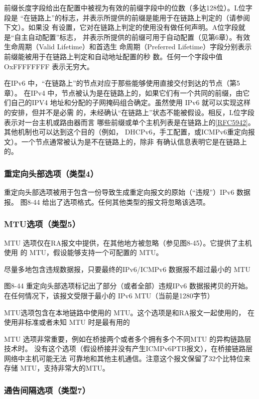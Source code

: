 前缀长度字段给出在配置中被视为有效的前缀字段中的位数（多达128位）。L位字段是
“在链路上”的标志，并表示所提供的前缀是能用于在链路上判定的（请参阅下文）。如果没
有设置，它对在链路上判定的使用没有做任何声明。A位字段就是“自主自动配置”标志，
并表示所提供的前缀可用于自动配置（见第6章）。有效生命周期（Valid Lifetime）和首选生
命周期（Preferred Lifetime）字段分别表示前缀能被用于在链路上判定和自动地址配置的秒
数。任何一个字段中值 OxFFFFFFFF 表示无穷大。

在IPv6 中，“在链路上”的节点对应于那些能够使用直接交付到达的节点（第5章）。
在IPv4 中，节点被认为是在链路上的，如果它们有一个共同的前缀，由它们自己的IPV4
地址和分配的子网掩码组合确定。虽然使用 IPv6 就可以实现这样的安排，但并不是必需
的，未经确认“在链路上”状态不能被假设。相反，L位字段表示对一台主机或路由器而言
哪些前缀或单个主机列表是在链路上的\href{https://www.rfc-editor.org/rfc/rfc5942}{[RFC5942]}。其他机制也可以达到这个目的（例如，
DHCPv6，手工配置，或ICMPv6重定向报文）。一个节点通常被认为是不在链路上的，除非
有确认信息表明它是在链路上的。

\subsubsection{重定向头部选项（类型4）}
重定向头部选项被用于包含一份导致生成重定向报文的原始（“违规”）IPv6 数据报。
图8-44 给出了选项格式。任何其他类型的报文将忽略该选项。

\subsubsection{MTU选项（类型5）}

MTU 选项仅在RA报文中提供，在其他地方被忽略（参见图8-45）。它提供了主机使用
的 MTU，假设能够支持一个可配置的 MTU。

尽量多地包含违规数据报，只要最终的IPv6/ICMPv6 数据报不超过最小的 MTU

图8-44 重定向头部选项标记出了部分（或者全部）违规IPv6 数据报拷贝的开始。
在任何情况下，该报文受限于最小的 IPv6 MTU（当前是1280字节）

MTU选项包含在本地链路中使用的 MTU。这个选项是和RA报文一起使用的，
在使用非标准或者未知 MTU 时是最有用的

MTU 选项非常重要，例如在桥接两个或者多个拥有多个不同MTU 的异构链路层技术时。
没有这个选项（假设桥接并没有产生ICMPv6PTB报文），在桥接链路层网络中主机可能无法
可靠地和其他主机通信。注意这个报文保留了32个比特位来存储 MTU，支持非常大的MTU。

\subsubsection{通告间隔选项（类型7）}

